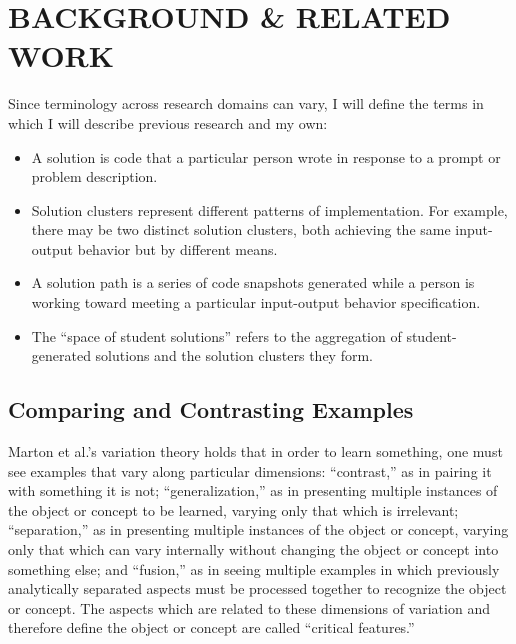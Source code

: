 \documentclass[12pt]{article}
\begin{document}
\section{BACKGROUND \& RELATED WORK}



Since terminology across research domains can vary, I will define the terms in which I will describe previous research and my own: 
\begin{itemize}
\item A solution is code that a particular person wrote in response to a prompt or problem description.
\item Solution clusters represent different patterns of implementation. For example, there may be two distinct solution clusters, both achieving the same input-output behavior but by different means. 
\item A solution path is a series of code snapshots generated while a person is working toward meeting a particular input-output behavior specification. 
\item The ``space of student solutions'' refers to the aggregation of student-generated solutions and the solution clusters they form.
\end{itemize}

\subsection{Comparing and Contrasting Examples}


Marton et al.'s variation theory \cite{Marton13} holds that in order to learn something, one must see examples that vary along particular dimensions: ``contrast,'' as in pairing it with something it is not; ``generalization,'' as in presenting multiple instances of the object or concept to be learned, varying only that which is irrelevant; ``separation,'' as in presenting multiple instances of the object or concept, varying only that which can vary internally without changing the object or concept into something else; and ``fusion,'' as in seeing multiple examples in which previously analytically separated aspects must be processed together to recognize the object or concept. The aspects which are related to these dimensions of variation and therefore define the object or concept are called ``critical features.''
\end{document}

